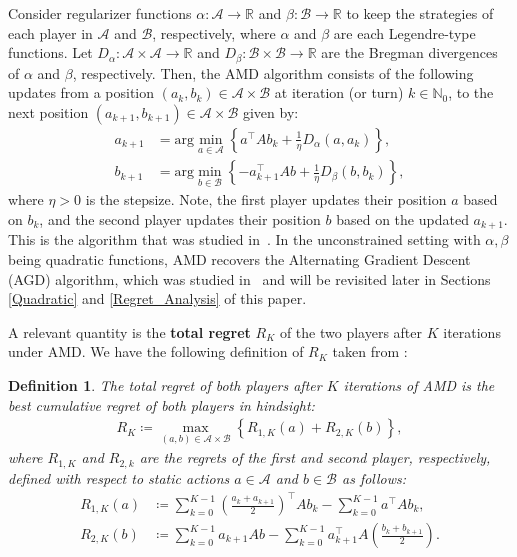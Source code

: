 \documentclass[11pt]{article}
\newtheorem{definition}{Definition}
\newcommand{\R}{\mathbb{R}}
\newcommand{\N}{\mathbb{N}}
\newcommand{\A}{\mathcal{A}}
\newcommand{\B}{\mathcal{B}}
\begin{document}
Consider regularizer functions $\alpha:\mathcal{A}\rightarrow\R$ and $\beta:\mathcal{B}\rightarrow\R$ to keep the strategies of each player in $\A$ and $\B$, respectively, where $\alpha$ and $\beta$ are each Legendre-type functions.
Let $D_{\alpha}:\A\times\A\rightarrow\R$ and $D_{\beta}:\B\times\B\rightarrow\R$ are the Bregman divergences of $\alpha$ and $\beta$, respectively. Then, the AMD algorithm consists of the following updates from a position $\left(a_{k},b_{k}\right) \in \A \times \B$ at iteration (or turn) $k \in \N_0$, to the next position $(a_{k+1}, b_{k+1}) \in \A \times \B$ given by:
\begin{subequations}\label{losses}
\begin{align}
       a_{k+1}&=\textrm{arg}\min_{a\in\mathcal{A}}\left\{a^{\top}Ab_{k}+\frac{1}{\eta}D_{\alpha}\left(a,a_{k}\right)\right\},\label{lossesa}
    \\
    b_{k+1}&=\textrm{arg}\min_{b\in\mathcal{B}}\left\{-a_{k+1}^{\top}Ab+\frac{1}{\eta}D_{\beta}\left(b,b_{k}\right)\right\},\label{lossesb}
\end{align}
\end{subequations}
where $\eta>0$ is the stepsize. 
Note, the first player updates their position $a$ based on $b_{k}$, and the second player updates their position $b$ based on the updated $a_{k+1}$.
This is the algorithm that was studied in~\cite{Wibisono2022}.
In the unconstrained setting with $\alpha, \beta$ being quadratic functions, AMD recovers the Alternating Gradient Descent (AGD) algorithm, which was studied in~\cite{pmlr-v125-bailey20a} and will be revisited later in Sections \ref{Quadratic} and \ref{Regret_Analysis} of this paper.


A relevant quantity is the \textbf{total regret} $R_{K}$ of the two players after $K$ iterations under AMD. We have the following definition of $R_{K}$ taken from \cite{Wibisono2022, pmlr-v125-bailey20a}: 

\begin{definition}
    The \textit{total regret} of both players after $K$ iterations of AMD is the best cumulative regret of both players in hindsight:
    \begin{gather}
        R_{K}\coloneqq \max_{(a,b)\in\mathcal{A}\times\mathcal{B}}\left\{R_{1,K}(a)+R_{2,K}(b)\right\},\nonumber
    \end{gather}
    where $R_{1,K}$ and $R_{2,k}$ are the regrets of the first and second player, respectively, defined with respect to static actions $a\in\mathcal{A}$ and $b\in\mathcal{B}$ as follows:
    \begin{align*}
        R_{1,K}(a) &\coloneqq \sum_{k=0}^{K-1}{\left(\frac{a_{k}+a_{k+1}}{2}\right)^{\top}Ab_{k}}-\sum_{k=0}^{K-1}{a^{\top}Ab_{k}}, \\
        R_{2,K}(b) &\coloneqq \sum_{k=0}^{K-1}{a_{k+1}Ab}-\sum_{k=0}^{K-1}{a_{k+1}^{\top}A\left(\frac{b_{k}+b_{k+1}}{2}\right)}.
    \end{align*}
\end{definition}
 
\end{document}

